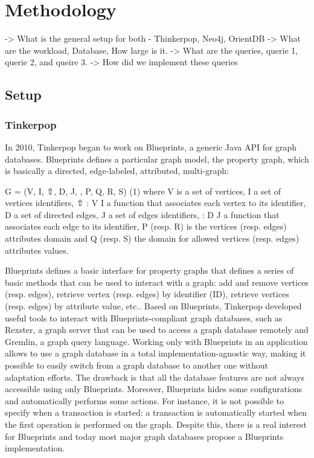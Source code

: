 
\section{Methodology}


-> What is the general setup for both - Thinkerpop, Neo4j, OrientDB
-> What are the workload, Database, How large is it.
-> What are the queries, querie 1, querie 2, and queire 3.
-> How did we implement these queries

\subsection{Setup}


\subsubsection{Tinkerpop}

In 2010, Tinkerpop began to work on Blueprints, a generic Java API for graph databases. Blueprints defines a particular graph model, the property graph, which is basically a directed, edge-labeled, attributed, multi-graph:

G = (V, I, ⇧, D, J, , P, Q, R, S) (1)
where 
V is a set of vertices, 
I a set of vertices identifiers, 
⇧ :
V  I a function that associates each vertex to its identifier, D
a set of directed edges, J a set of edges identifiers,  : D  J
a function that associates each edge to its identifier, P (resp. R)
is the vertices (resp. edges) attributes domain and Q (resp. S)
the domain for allowed vertices (resp. edges) attributes values.

Blueprints defines a basic interface for property graphs that defines a series of basic methods that can be used to interact with a graph: add and remove vertices (resp. edges), retrieve vertex (resp. edges) by identifier (ID), retrieve vertices (resp. edges) by attribute value, etc.. Based on Blueprints, Tinkerpop developed useful tools to interact with Blueprints-compliant graph databases, such as Rexster, a graph server that can be used to access a graph database remotely and Gremlin, a graph query language. Working only with Blueprints in an application allows to use a graph database in a total implementation-agnostic way, making it possible to easily switch from a graph database to another one without adaptation efforts. The drawback is that all the database features are not always accessible using only Blueprints. Moreover, Blueprints hides some configurations and automatically performs some actions. For instance, it is not possible to specify when a transaction is started: a transaction is automatically started when the first operation is performed on the graph. Despite this, there is a real interest for Blueprints and today most major graph databases propose a Blueprints implementation.


